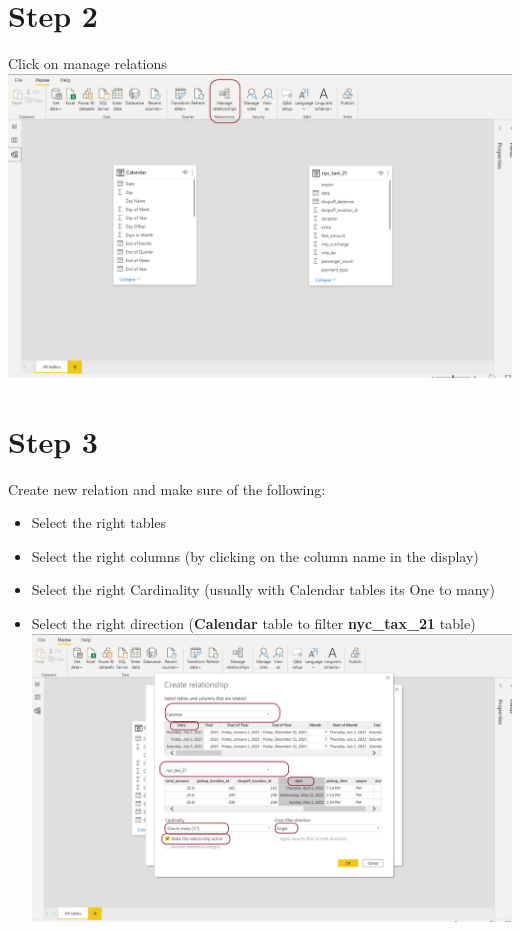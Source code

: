 \documentclass[
]{book}
\providecommand{\tightlist}{%
  \setlength{\itemsep}{0pt}\setlength{\parskip}{0pt}}
\begin{document}
\hypertarget{step-2-1}{%
\section{Step 2}\label{step-2-1}}

Click on manage relations
\includegraphics{assets/datamodel2.png}

\hypertarget{step-3-1}{%
\section{Step 3}\label{step-3-1}}

Create new relation and make sure of the following:

\begin{itemize}
\tightlist
\item
  Select the right tables\\
\item
  Select the right columns (by clicking on the column name in the display)\\
\item
  Select the right Cardinality (usually with Calendar tables its One to many)\\
\item
  Select the right direction (\textbf{Calendar} table to filter \textbf{nyc\_tax\_21} table)\\
  \includegraphics{assets/datamodel3.png}
\end{itemize}
\end{document}
